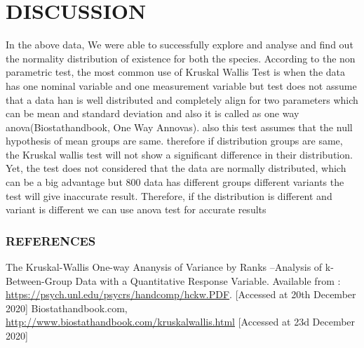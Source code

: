 \documentclass[
]{article}
\begin{document}
\hypertarget{discussion}{%
\section{DISCUSSION}\label{discussion}}

In the above data, We were able to successfully explore and analyse and
find out the normality distribution of existence for both the species.
According to the non parametric test, the most common use of Kruskal
Wallis Test is when the data has one nominal variable and one
measurement variable but test does not assume that a data han is well
distributed and completely align for two parameters which can be mean
and standard deviation and also it is called as one way
anova(Biostathandbook, One Way Annovas). also this test assumes that the
null hypothesis of mean groups are same. therefore if distribution
groups are same, the Kruskal wallis test will not show a significant
difference in their distribution. Yet, the test does not considered that
the data are normally distributed, which can be a big advantage but 800
data has different groups different variants the test will give
inaccurate result. Therefore, if the distribution is different and
variant is different we can use anova test for accurate results

\hypertarget{references}{%
\subsubsection{REFERENCES}\label{references}}

The Kruskal-Wallis One-way Ananysis of Variance by Ranks --Analysis of
k-Between-Group Data with a Quantitative Response Variable. Available
from : \url{https://psych.unl.edu/psycrs/handcomp/hckw.PDF}. {[}Accessed
at 20th December 2020{]} Biostathandbook.com,
\url{http://www.biostathandbook.com/kruskalwallis.html} {[}Accessed at
23d December 2020{]}
\end{document}
